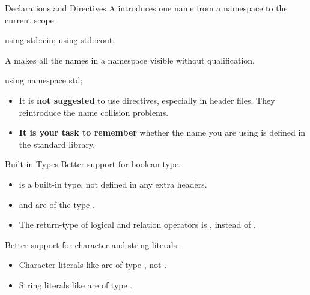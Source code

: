 \documentclass{beamer}
\begin{document}
\begin{frame}[fragile]{ Declarations and Directives}
    A   introduces one name from a namespace to the current scope.
    \begin{cpp}
using std::cin;
using std::cout;
    \end{cpp}
    \pause
    A   makes all the names in a namespace visible without qualification.
    \begin{cpp}
using namespace std;
    \end{cpp}
    \begin{itemize}
        \item It is \textbf{not suggested} to use  directives, especially in header files. They reintroduce the name collision problems.
        \item \textbf{It is your task to remember} whether the name you are using is defined in the standard library.
    \end{itemize}
\end{frame}

\begin{frame}{Built-in Types}
    Better support for boolean type:
    \begin{itemize}
        \item {} is a built-in type, not defined in any extra headers.
        \item {} and  are of the type .
        \item The return-type of logical and relation operators is , instead of .
    \end{itemize}
    \pause
    Better support for character and string literals:
    \begin{itemize}
        \item Character literals like  are of type , not .
        \item String literals like  are of type \ttt{[N+1]}.
    \end{itemize}
\end{frame}
\end{document}
